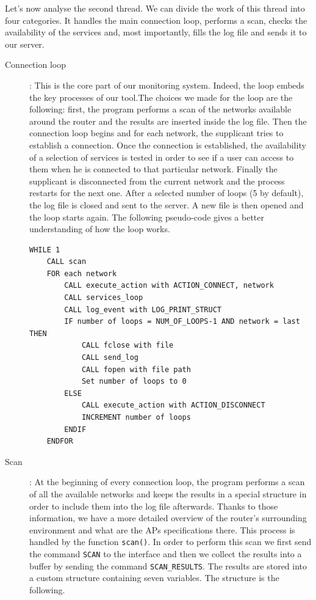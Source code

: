 Let's now analyse the second thread. We can divide the work of this thread into four categories. It handles the main connection loop, performs a scan, checks the availability of the services and, most importantly, fills the log file and sends it to our server. 

\begin{description}
	\item[Connection loop]: This is the core part of our monitoring system. Indeed, the loop embeds the key processes of our tool.The choices we made for the loop are the following: first, the program performs a scan of the networks available around the router and the results are inserted inside the log file. Then the connection loop begins and for each network, the supplicant tries to establish a connection. Once the connection is established, the availability of a selection of services is tested in order to see if a user can access to them when he is connected to that particular network. Finally the supplicant is disconnected from the current network and the process restarts for the next one. After a selected number of loops (5 by default), the log file is closed and sent to the server. A new file is then opened and the loop starts again. The following pseudo-code gives a better understanding of how the loop works.

\begin{lstlisting}[frame=single,breaklines=true,caption={Connection loop pseudo-code}]
WHILE 1
	CALL scan
	FOR each network
		CALL execute_action with ACTION_CONNECT, network
		CALL services_loop
		CALL log_event with LOG_PRINT_STRUCT
		IF number of loops = NUM_OF_LOOPS-1 AND network = last THEN
			CALL fclose with file
			CALL send_log
			CALL fopen with file path
			Set number of loops to 0
		ELSE
			CALL execute_action with ACTION_DISCONNECT
			INCREMENT number of loops
		ENDIF
	ENDFOR
\end{lstlisting}

	\item[Scan]: At the beginning of every connection loop, the program performs a scan of all the available networks and keeps the results in a special structure in order to include them into the log file afterwards. Thanks to those information, we have a more detailed overview of the router's surrounding environment and what are the APs specifications there. This process is handled by the function \texttt{scan()}. In order to perform this scan we first send the command \texttt{SCAN} to the interface and then we collect the results into a buffer by sending the command \texttt{SCAN\_RESULTS}. The results are stored into a custom structure containing seven variables. The structure is the following.\\


\end{description}
